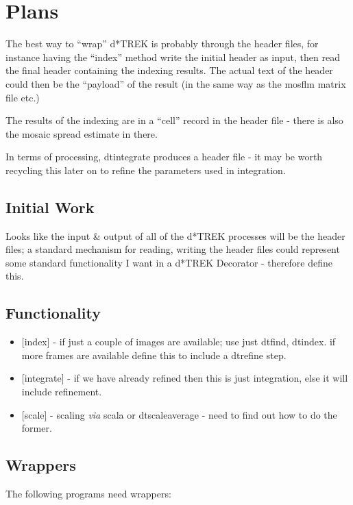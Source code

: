 \documentclass[a4paper, 11pt]{article}
\begin{document}
\section{Plans}

The best way to ``wrap'' d*TREK is probably through the header files, for 
instance having the ``index'' method write the initial header as input, then 
read the final header containing the indexing results. The actual text of the
header could then be the ``payload'' of the result (in the same way as the 
mosflm matrix file etc.)

The results of the indexing are in a ``cell'' record in the header file - 
there is also the mosaic spread estimate in there. 

In terms of processing, dtintegrate produces a header file - it may be 
worth recycling this later on to refine the parameters used in integration.

\subsection{Initial Work}

Looks like the input \& output of all of the d*TREK processes will be 
the header files; a standard mechanism for reading, writing the header
files could represent some standard functionality I want in a d*TREK
Decorator - therefore define this.

\subsection{Functionality}

\begin{itemize}
\item{[index] - if just a couple of images are available; use just 
dtfind, dtindex. if more frames are available define this to include
a dtrefine step.}
\item{[integrate] - if we have already refined then this is just integration,
else it will include refinement.}
\item{[scale] - scaling \emph{via} scala or dtscaleaverage - need to find
out how to do the former.}
\end{itemize}

\subsection{Wrappers}

The following programs need wrappers:
\end{document}
